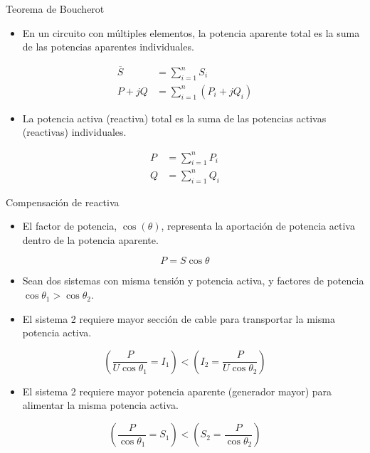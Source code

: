 \documentclass[xcolor={usenames,svgnames,dvipsnames}]{beamer}
\begin{document}
\begin{frame}[label={sec:org1230bd3}]{Teorema de Boucherot}
\begin{itemize}
\item En un circuito con múltiples elementos, la potencia aparente total es la suma de las potencias aparentes individuales.
\end{itemize}
\begin{align*}
  \overline{S} &= \sum_{i = 1}^{n} S_i\\
  P + jQ &= \sum^n_{i = 1} (P_i + jQ_i)
\end{align*}

\begin{itemize}
\item La potencia activa (reactiva) total es la suma de las potencias activas (reactivas) individuales.
\end{itemize}

\begin{align*}
P &= \sum_{i = 1}^n P_i\\
Q &= \sum_{i = 1}^n Q_i
\end{align*}
\end{frame}

\begin{frame}[label={sec:orgd7cb2c0}]{Compensación de reactiva}
\begin{itemize}
\item El factor de potencia, \(\cos(\theta)\), representa la aportación de potencia activa dentro de la potencia aparente.
\end{itemize}
\[
P = S \cos \theta
\]

\begin{itemize}
\item Sean dos sistemas con misma tensión y potencia activa, y factores de potencia \(\cos \theta_1 > \cos \theta_2\).

\item El sistema 2 requiere \alert{mayor sección} de cable para transportar la misma potencia activa.
\end{itemize}
\[
  \left(\frac{P}{U \cos \theta_1} = I_1 \right) < \left( I_2 = \frac{P}{U \cos \theta_2}\right) 
\]
\begin{itemize}
\item El sistema 2 requiere \alert{mayor potencia aparente} (generador mayor) para alimentar la misma potencia activa.
\end{itemize}
\[
  \left(\frac{P}{\cos \theta_1} = S_1 \right) < \left( S_2 = \frac{P}{\cos \theta_2}\right) 
\]
\end{frame}
\end{document}
